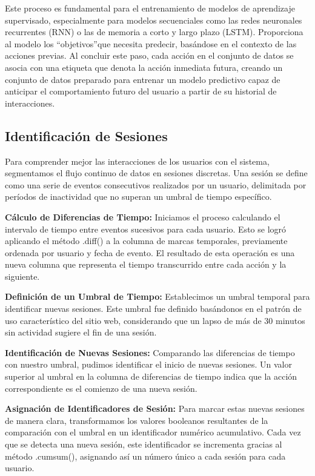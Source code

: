 Este proceso es fundamental para el entrenamiento de modelos de aprendizaje supervisado, especialmente para modelos secuenciales como las redes neuronales recurrentes (RNN) o las de memoria a corto y largo plazo (LSTM). Proporciona al modelo los \textquotedblleft objetivos\textquotedblright que necesita predecir, basándose en el contexto de las acciones previas. Al concluir este paso, cada acción en el conjunto de datos se asocia con una etiqueta que denota la acción inmediata futura, creando un conjunto de datos preparado para entrenar un modelo predictivo capaz de anticipar el comportamiento futuro del usuario a partir de su historial de interacciones.

\subsection{Identificación de Sesiones}

Para comprender mejor las interacciones de los usuarios con el sistema, segmentamos el flujo continuo de datos en sesiones discretas. Una sesión se define como una serie de eventos consecutivos realizados por un usuario, delimitada por períodos de inactividad que no superan un umbral de tiempo específico.

\textbf{Cálculo de Diferencias de Tiempo:} Iniciamos el proceso calculando el intervalo de tiempo entre eventos sucesivos para cada usuario. Esto se logró aplicando el método .diff() a la columna de marcas temporales, previamente ordenada por usuario y fecha de evento. El resultado de esta operación es una nueva columna que representa el tiempo transcurrido entre cada acción y la siguiente.

\textbf{Definición de un Umbral de Tiempo:} Establecimos un umbral temporal para identificar nuevas sesiones. Este umbral fue definido basándonos en el patrón de uso característico del sitio web, considerando que un lapso de más de 30 minutos sin actividad sugiere el fin de una sesión.

\textbf{Identificación de Nuevas Sesiones:} Comparando las diferencias de tiempo con nuestro umbral, pudimos identificar el inicio de nuevas sesiones. Un valor superior al umbral en la columna de diferencias de tiempo indica que la acción correspondiente es el comienzo de una nueva sesión.

\textbf{Asignación de Identificadores de Sesión:} Para marcar estas nuevas sesiones de manera clara, transformamos los valores booleanos resultantes de la comparación con el umbral en un identificador numérico acumulativo. Cada vez que se detecta una nueva sesión, este identificador se incrementa gracias al método .cumsum(), asignando así un número único a cada sesión para cada usuario.

